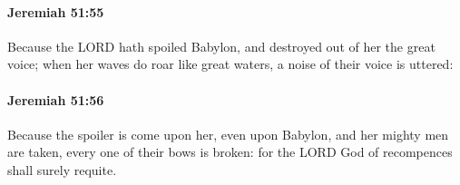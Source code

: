 		\paragraph{Jeremiah 51:55} %
			\label{JEREMIAH-51-55}

			Because the LORD hath spoiled Babylon, and destroyed out of her the great voice; when her waves do roar like great waters, a noise of their voice is uttered:


		\paragraph{Jeremiah 51:56} %
			\label{JEREMIAH-51-56}

			Because the spoiler is come upon her, even upon Babylon, and her mighty men are taken, every one of their bows is broken: for the LORD God of recompences shall surely requite.


